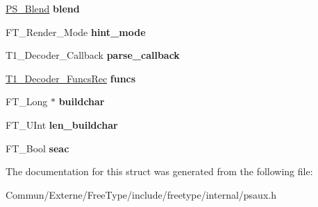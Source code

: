 \begin{DoxyCompactItemize}
\item 
\hyperlink{struct_p_s___blend_rec__}{P\+S\+\_\+\+Blend} {\bfseries blend}\hypertarget{struct_t1___decoder_rec___a0cd698c7041cb4f319949b62f215f7c7}{}\label{struct_t1___decoder_rec___a0cd698c7041cb4f319949b62f215f7c7}

\item 
F\+T\+\_\+\+Render\+\_\+\+Mode {\bfseries hint\+\_\+mode}\hypertarget{struct_t1___decoder_rec___a364b15149edb573dcc79be015eba61b4}{}\label{struct_t1___decoder_rec___a364b15149edb573dcc79be015eba61b4}

\item 
T1\+\_\+\+Decoder\+\_\+\+Callback {\bfseries parse\+\_\+callback}\hypertarget{struct_t1___decoder_rec___a840af0b01e7adb1e3aa521a936196b62}{}\label{struct_t1___decoder_rec___a840af0b01e7adb1e3aa521a936196b62}

\item 
\hyperlink{struct_t1___decoder___funcs_rec__}{T1\+\_\+\+Decoder\+\_\+\+Funcs\+Rec} {\bfseries funcs}\hypertarget{struct_t1___decoder_rec___a6b0f5f7cb3f44e88880aa9c927d79775}{}\label{struct_t1___decoder_rec___a6b0f5f7cb3f44e88880aa9c927d79775}

\item 
F\+T\+\_\+\+Long $\ast$ {\bfseries buildchar}\hypertarget{struct_t1___decoder_rec___a967ee06cbbdc8823be8f95df5db625b9}{}\label{struct_t1___decoder_rec___a967ee06cbbdc8823be8f95df5db625b9}

\item 
F\+T\+\_\+\+U\+Int {\bfseries len\+\_\+buildchar}\hypertarget{struct_t1___decoder_rec___a55fd1c88d6f7badaec2aa13db17c816f}{}\label{struct_t1___decoder_rec___a55fd1c88d6f7badaec2aa13db17c816f}

\item 
F\+T\+\_\+\+Bool {\bfseries seac}\hypertarget{struct_t1___decoder_rec___a45bf18b54ff973177ea3061ef0b705c6}{}\label{struct_t1___decoder_rec___a45bf18b54ff973177ea3061ef0b705c6}

\end{DoxyCompactItemize}


The documentation for this struct was generated from the following file\+:\begin{DoxyCompactItemize}
\item 
Commun/\+Externe/\+Free\+Type/include/freetype/internal/psaux.\+h\end{DoxyCompactItemize}

